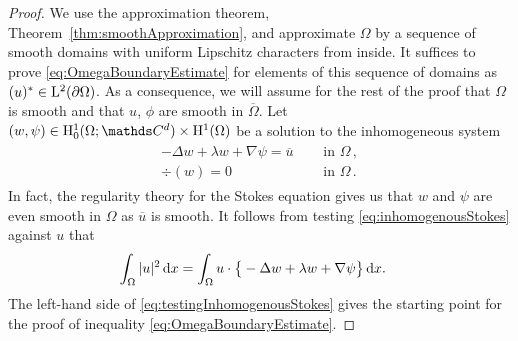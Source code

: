 \begin{proof}
  We use the approximation theorem, Theorem~\ref{thm:smoothApproximation}, and approximate $\Omega$ by a sequence of smooth domains with uniform Lipschitz characters from inside.
  It suffices to prove \eqref{eq:OmegaBoundaryEstimate} for elements of this sequence of domains as $(u)^* \in \mathrm{L}^2(\partial\Omega)$.
  As a consequence, we will assume for the rest of the proof that $\Omega$ is smooth and that $u$, $\phi$ are smooth in $\overline\Omega$.
  Let $(w,\psi) \in \HH_0^1(\Omega; \C^d) \times \HH^1(\Omega)$ be a solution to the inhomogeneous system
  \begin{align}
    \label{eq:inhomogenousStokes}
    \begin{alignedat}{1}
      - \Delta w + \lambda w + \nabla \psi = \overline u &\quad\text{ in } \Omega\,, \\
      \div(w) = 0 &\quad\text{ in } \Omega\,.
    \end{alignedat}
  \end{align}
  In fact, the regularity theory for the Stokes equation gives us that $w$ and $\psi$ are even smooth in $\Omega$ as $\overline u$ is smooth.
  It follows from testing \eqref{eq:inhomogenousStokes} against $u$ that
  \begin{align}
    \label{eq:testingInhomogenousStokes}
    \int_\Omega |u|^2 \, {\operatorname{d}\!{x}}
    &= \int_\Omega u \cdot \big\{ - \Delta w + \lambda w + \nabla \psi \big\} \, {\operatorname{d}\!{x}}.
  \end{align}
  The left-hand side of \eqref{eq:testingInhomogenousStokes} gives the starting point for the proof of inequality \eqref{eq:OmegaBoundaryEstimate}.
  

\end{proof}
